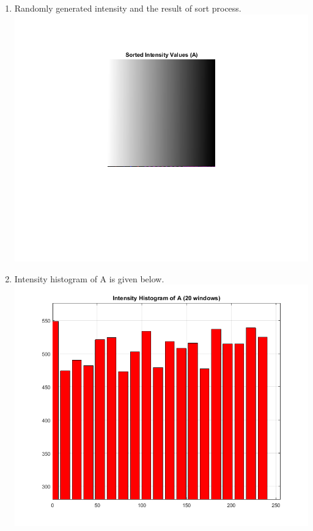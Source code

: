 \documentclass[man]{apa6}
\begin{document}
\begin{enumerate}
			\begin{enumerate}
				\item Randomly generated intensity and the result of sort process.
					\includegraphics[width=\linewidth]{plots/1-A-4/a_sorted.png}
			
				\item Intensity histogram of A is given below.
					\includegraphics[width=\linewidth]{plots/1-A-4/b.png}
				

\end{enumerate}
\end{enumerate}
\end{document}
